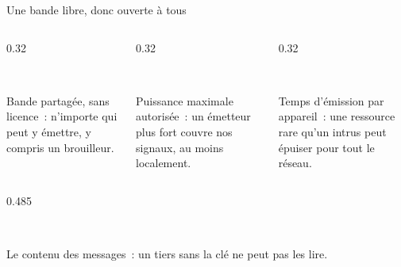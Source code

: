 \begin{frame}{Une bande libre, donc ouverte à tous}
  \begin{columns}[T]
    \begin{column}{0.32\textwidth}
      \begin{carte}[height=1.75cm,valign=top,colback=insarose!45]
        \raggedright{}\\[1pt]
        {\footnotesize Bande partagée, sans licence~: n'importe qui peut y émettre, y compris un brouilleur.\par}
      \end{carte}
    \end{column}
    \begin{column}{0.32\textwidth}
      \begin{carte}[height=1.75cm,valign=top,colback=insarose!45]
        \raggedright{}\\[1pt]
        {\footnotesize Puissance maximale autorisée~: un émetteur plus fort couvre nos signaux, au moins localement.\par}
      \end{carte}
    \end{column}
    \begin{column}{0.32\textwidth}
      \begin{carte}[height=1.75cm,valign=top,colback=insarose!45]
        \raggedright{}\\[1pt]
        {\footnotesize Temps d'émission par appareil~: une ressource rare qu'un intrus peut épuiser pour tout le réseau.\par}
      \end{carte}
    \end{column}
  \end{columns}
  \vspace{0.12cm}
  \begin{columns}[T]
    \begin{column}{0.485\textwidth}
      \begin{carte}[height=1.3cm,valign=top,colback=white,colframe=insarouge,boxrule=0.7pt]
        \raggedright{}\\[1pt]
        {\footnotesize Le contenu des messages~: un tiers sans la clé ne peut pas les lire.\par}
      \end{carte}

\end{column}
\end{columns}
\end{frame}
